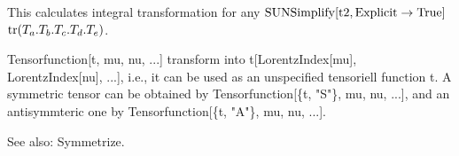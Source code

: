 This calculates integral transformation for any \(\mathrm{SUNSimplify}[\mathrm{t2},\mathrm{Explicit}\rightarrow \mathrm{True}]\)
\(\mathrm{tr}({T_a}.{T_b}.{T_c}.{T_d}.{T_e})\).









Tensorfunction[t, mu, nu, ...] transform into t[LorentzIndex[mu], LorentzIndex[nu], ...], i.e., it can be used as an unspecified
  tensoriell function t. A symmetric tensor can be obtained by Tensorfunction[\{t, "S"\}, mu, nu, ...], and an antisymmteric one by
  Tensorfunction[\{t, "A"\}, mu, nu, ...].

See also:  Symmetrize.










